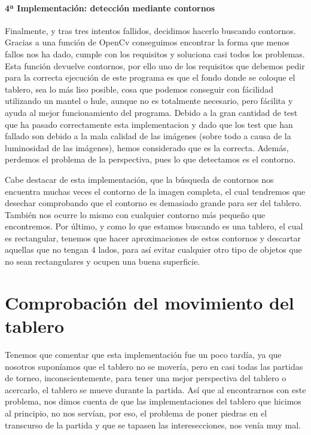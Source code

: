 \documentclass[12pt,a4paper]{report}
\begin{document}
\paragraph{4ª Implementación: detección mediante contornos}

Finalmente, y tras tres intentos fallidos, decidimos hacerlo buscando contornos.
Gracias a una función de OpenCv conseguimos encontrar la forma que menos fallos
nos ha dado, cumple con los requisitos y soluciona casi todos los problemas.
Esta función devuelve contornos, por ello uno de los requisitos que debemos
pedir para la correcta ejecución de este programa es que el fondo donde se
coloque el tablero, sea lo más liso posible, cosa que podemos conseguir con
fácilidad utilizando un mantel o hule, aunque no es totalmente necesario, pero
fácilita y ayuda al mejor funcionamiento del programa. Debido a la gran cantidad
de test que ha pasado correctamente esta implementacion y dado que los test que
han fallado son debido a la mala calidad de las imágenes (sobre todo a causa de
la luminosidad de las imágenes), hemos considerado que es la correcta. Además,
perdemos el problema de la perspectiva, pues lo que detectamos es el contorno.

Cabe destacar de esta implementación, que la búsqueda de contornos nos encuentra
muchas veces el contorno de la imagen completa, el cual tendremos que desechar
comprobando que el contorno es demasiado grande para ser del tablero. También
nos ocurre lo mismo con cualquier contorno más pequeño que encontremos. Por
último, y como lo que estamos buscando es una tablero, el cual es rectangular,
tenemos que hacer aproximaciones de estos contornos y descartar aquellas que no
tengan 4 lados, para así evitar cualquier otro tipo de objetos que no sean
rectangulares y ocupen una buena superficie. 




\section{Comprobación del movimiento del tablero}

Tenemos que comentar que esta implementación fue un poco tardía, ya que nosotros
suponíamos que el tablero no se movería, pero en casi todas las partidas de
torneo, inconscientemente, para tener una mejor perspectiva del tablero o
acercarlo, el tablero se mueve durante la partida. Así que al encontrarnos con
este problema, nos dimos cuenta de que las implementaciones del tablero que
hicimos al principio, no nos servían, por eso, el problema de poner piedras en
el transcurso de la partida y que se tapasen las interesecciones, nos venía muy
mal. 
\end{document}
